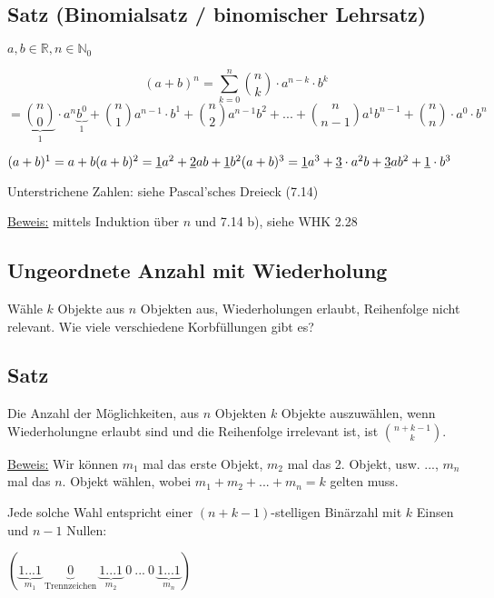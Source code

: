 \documentclass[a4paper, 12pt, twoside] {article}
\begin{document}
\subsection{Satz (Binomialsatz / binomischer Lehrsatz)} %

$a,b \in \mathbb{R}, n \in \mathbb{N}_0$

$$(a+b)^n = \sum_{k=0}^n \binom{n}{k} \cdot a^{n-k} \cdot b^k$$
$$ = \underbrace{\binom{n}{0}}_{1} \cdot a^n \underbrace{b^0}_{1} + \binom{n}{1} a^{n-1} \cdot b^1 + \binom{n}{2} a^{n-1} b^2 + ... + \binom{n}{n-1} a^1 b^{n-1} + \binom{n}{n} \cdot a^0 \cdot b^n$$

$(a+b)^1 = a + b \\
(a+b)^2 = \uline{1}a^2 + \uline{2}ab + \uline{1}b^2 \\
(a+b)^3 = \uline{1}a^3 + \uline{3} \cdot a^2b + \uline{3}ab^2 + \uline{1} \cdot b^3$

Unterstrichene Zahlen: siehe Pascal'sches Dreieck (7.14)

\underline{Beweis:} mittels Induktion über $n$ und 7.14 b), siehe WHK 2.28

\subsection{Ungeordnete Anzahl mit Wiederholung} %


Wähle $k$ Objekte aus $n$ Objekten aus, Wiederholungen erlaubt, Reihenfolge nicht relevant. Wie viele verschiedene Korbfüllungen gibt es?

\subsection{Satz} %

Die Anzahl der Möglichkeiten, aus $n$ Objekten $k$ Objekte auszuwählen, wenn Wiederholungne erlaubt sind und die Reihenfolge irrelevant ist, ist $\binom{n+k-1}{k}$.

\underline{Beweis:} Wir können $m_1$ mal das erste Objekt, $m_2$ mal das 2. Objekt, usw. ..., $m_n$ mal das $n$. Objekt wählen, wobei $m_1+m_2+...+m_n = k$ gelten muss.

Jede solche Wahl entspricht einer $(n+k-1)$-stelligen Binärzahl mit $k$ Einsen und $n-1$ Nullen:

$(\underbrace{1...1}_{m_1}\ \underbrace{0}_{\text{Trennzeichen}}\ \underbrace{1...1}_{m_2}\ 0\ ... \ 0\ \underbrace{1...1}_{m_n})$
\end{document}
